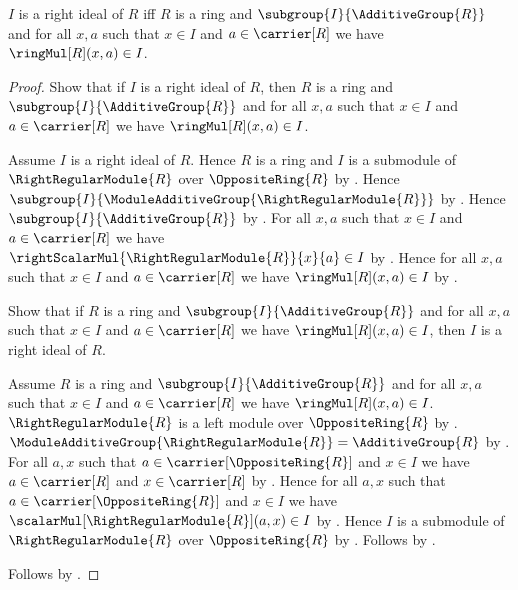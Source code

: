 \begin{theorem}\label{right_ideal_expanded_iff}
    $I$ is a right ideal of $R$ iff
        $R$ is a ring and
        $\subgroup{I}{\AdditiveGroup{R}}$ and
        for all $x,a$ such that $x\in I$ and $a\in\carrier[R]$ we have
            $\ringMul[R](x,a)\in I$.
\end{theorem}
\begin{proof}
    Show that if $I$ is a right ideal of $R$, then
        $R$ is a ring and
        $\subgroup{I}{\AdditiveGroup{R}}$ and
        for all $x,a$ such that $x\in I$ and $a\in\carrier[R]$ we have
            $\ringMul[R](x,a)\in I$.
    \begin{subproof}
        Assume $I$ is a right ideal of $R$.
        Hence $R$ is a ring and
            $I$ is a submodule of $\RightRegularModule{R}$ over
                $\OppositeRing{R}$ by
            .
        Hence $\subgroup{I}{
            \ModuleAdditiveGroup{\RightRegularModule{R}}}$ by
            .
        Hence $\subgroup{I}{\AdditiveGroup{R}}$ by
            .
        For all $x,a$ such that $x\in I$ and $a\in\carrier[R]$ we have
            $\rightScalarMul{\RightRegularModule{R}}{x}{a}\in I$ by
            .
        Hence for all $x,a$ such that $x\in I$ and $a\in\carrier[R]$ we have
            $\ringMul[R](x,a)\in I$ by
            .
    \end{subproof}
    Show that if $R$ is a ring and
        $\subgroup{I}{\AdditiveGroup{R}}$ and
        for all $x,a$ such that $x\in I$ and $a\in\carrier[R]$ we have
            $\ringMul[R](x,a)\in I$, then
        $I$ is a right ideal of $R$.
    \begin{subproof}
        Assume $R$ is a ring and
            $\subgroup{I}{\AdditiveGroup{R}}$ and
            for all $x,a$ such that $x\in I$ and $a\in\carrier[R]$ we have
                $\ringMul[R](x,a)\in I$.
        $\RightRegularModule{R}$ is a left module over
            $\OppositeRing{R}$ by
            .
        $\ModuleAdditiveGroup{\RightRegularModule{R}}
            =\AdditiveGroup{R}$ by
            .
        For all $a,x$ such that $a\in\carrier[\OppositeRing{R}]$ and
            $x\in I$ we have
            $a\in\carrier[R]$ and $x\in\carrier[R]$ by
            .
        Hence for all $a,x$ such that
            $a\in\carrier[\OppositeRing{R}]$ and $x\in I$ we have
            $\scalarMul[\RightRegularModule{R}](a,x)\in I$ by
            .
        Hence $I$ is a submodule of $\RightRegularModule{R}$ over
            $\OppositeRing{R}$ by .
        Follows by .
    \end{subproof}
    Follows by \auto.
\end{proof}

